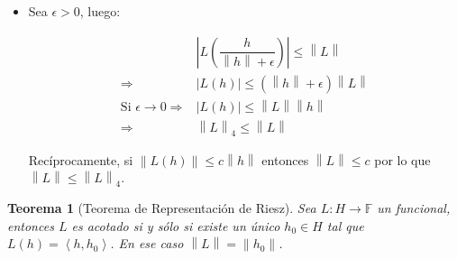 \documentclass[11pt]{article}
\newcommand{\norm}[1]{\left\lVert#1\right\rVert}
\newcommand{\abs}[1]{\left\lvert#1\right\rvert}
\newcommand{\ip}[1]{\left\langle#1\right\rangle}
\newtheorem{theorem}{Teorema}
\numberwithin{theorem}{subsection}
\newenvironment{proof}[1][Demostraci\'on]{\begin{trivlist}
		\item[\hskip \labelsep {\bfseries #1}]}{\end{trivlist}}
\newcommand{\qed}{\nobreak \ifvmode \relax \else
	\ifdim\lastskip<1.5em \hskip-\lastskip
	\hskip1.5em plus0em minus0.5em \fi \nobreak
	\vrule height0.75em width0.5em depth0.25em\fi}
\begin{document}
\begin{proof}
\begin{itemize}
		\item Sea $\epsilon > 0$, luego:
		
		\begin{equation*}
		\begin{array}{cc}
		& \abs{L\left(\dfrac{h}{\norm{h} + \epsilon}\right)} \leq \norm{L} \\
		\Longrightarrow  & \abs{L(h)} \leq \left(\norm{h} + \epsilon\right) \norm{L} \\
		\text{Si } \epsilon \rightarrow 0 \Longrightarrow  & \abs{L(h)} \leq \norm{L} \norm{h} \\
		\Longrightarrow  & \norm{L}_4 \leq \norm{L}
		\end{array}
		\end{equation*}
		
		Rec\'iprocamente, si $\norm{L(h)} \leq c \norm{h}$ entonces $\norm{L} \leq c$ por lo que $\norm{L} \leq \norm{L}_4$. \qed
		
	\end{itemize}
\end{proof}

\begin{theorem}[Teorema de Representaci\'on de Riesz]
	\label{Teorema de representacion de Riesz}
	Sea $L : H \rightarrow \mathbb{F}$ un funcional, entonces $L$ es acotado si y s\'olo si existe un \'unico $h_0 \in H$ tal que $L(h) = \ip{h,h_0}$. En ese caso $\norm{L} = \norm{h_0}$.
\end{theorem}
\end{document}
